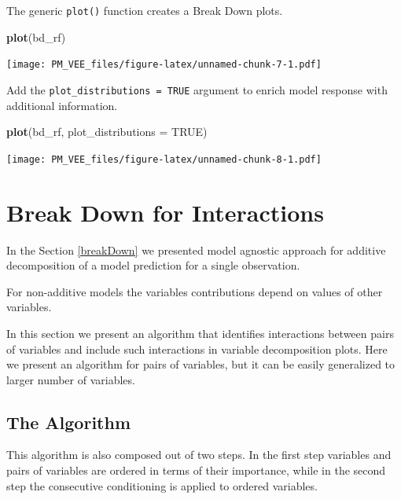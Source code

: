 \documentclass[]{book}
\newenvironment{Shaded}{\begin{snugshade}}{\end{snugshade}}
\newcommand{\DataTypeTok}[1]{\textcolor[rgb]{0.13,0.29,0.53}{#1}}
\newcommand{\KeywordTok}[1]{\textcolor[rgb]{0.13,0.29,0.53}{\textbf{#1}}}
\newcommand{\NormalTok}[1]{#1}
\newcommand{\OtherTok}[1]{\textcolor[rgb]{0.56,0.35,0.01}{#1}}
\theoremstyle{definition}
\theoremstyle{definition}
\theoremstyle{definition}
\theoremstyle{remark}
\begin{document}
The generic \texttt{plot()} function creates a Break Down plots.

\begin{Shaded}
\begin{Highlighting}[]
\KeywordTok{plot}\NormalTok{(bd_rf) }
\end{Highlighting}
\end{Shaded}

\texttt{[image: PM\_VEE\_files/figure-latex/unnamed-chunk-7-1.pdf]}

Add the \texttt{plot\_distributions\ =\ TRUE} argument to enrich model
response with additional information.

\begin{Shaded}
\begin{Highlighting}[]
\KeywordTok{plot}\NormalTok{(bd_rf, }\DataTypeTok{plot_distributions =} \OtherTok{TRUE}\NormalTok{) }
\end{Highlighting}
\end{Shaded}

\texttt{[image: PM\_VEE\_files/figure-latex/unnamed-chunk-8-1.pdf]}

\hypertarget{break-down-for-interactions}{%
\chapter{Break Down for
Interactions}\label{break-down-for-interactions}}

In the Section \ref{breakDown} we presented model agnostic approach for
additive decomposition of a model prediction for a single observation.

For non-additive models the variables contributions depend on values of
other variables.

In this section we present an algorithm that identifies interactions
between pairs of variables and include such interactions in variable
decomposition plots. Here we present an algorithm for pairs of
variables, but it can be easily generalized to larger number of
variables.

\hypertarget{the-algorithm-1}{%
\section{The Algorithm}\label{the-algorithm-1}}

This algorithm is also composed out of two steps. In the first step
variables and pairs of variables are ordered in terms of their
importance, while in the second step the consecutive conditioning is
applied to ordered variables.
\end{document}
